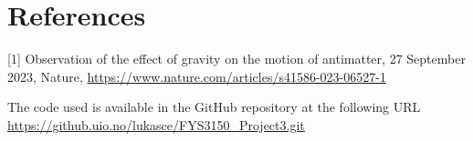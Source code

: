 \documentclass[english,notitlepage,reprint,nofootinbib]{revtex4-1}
\begin{document}
\section{References}
[1] Observation of the effect of gravity on the motion of antimatter, 27 September 2023, Nature,
\url{https://www.nature.com/articles/s41586-023-06527-1}



The code used is available in the GitHub repository at the following URL %
\url{https://github.uio.no/lukasce/FYS3150_Project3.git}

%
%

\onecolumngrid

%
\end{document}
